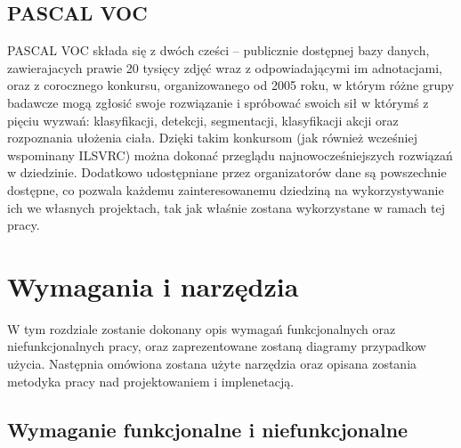 \documentclass[a4paper,twoside,12pt]{book}
\begin{document}
{{\section{PASCAL VOC}
{PASCAL VOC\cite{everingham2015pascal}\cite{PASCAL} składa się z dwóch cześci – publicznie dostępnej bazy danych, zawierajacych prawie 20 tysięcy zdjęć wraz z odpowiadającymi im adnotacjami, oraz z corocznego konkursu, organizowanego od 2005 roku, w którym różne grupy badawcze mogą zgłosić swoje rozwiązanie i spróbować swoich sił w którymś z pięciu wyzwań: klasyfikacji, detekcji, segmentacji, klasyfikacji akcji oraz rozpoznania ułożenia ciała.}
{Dzięki takim konkursom (jak również wcześniej wspominany ILSVRC) można dokonać przeglądu najnowocześniejszych rozwiązań w dziedzinie. Dodatkowo udostępniane przez organizatorów dane są powszechnie dostępne, co pozwala każdemu zainteresowanemu dziedziną na wykorzystywanie ich we własnych projektach, tak jak właśnie zostana wykorzystane w ramach tej pracy.
}

 
\chapter{Wymagania i narzędzia}
{W tym rozdziale zostanie dokonany opis wymagań funkcjonalnych oraz niefunkcjonalnych pracy, oraz zaprezentowane zostaną diagramy przypadkow użycia. Następnia omówiona zostana użyte narzędzia oraz opisana zostania metodyka pracy nad projektowaniem i implenetacją.}
\section{Wymaganie funkcjonalne i niefunkcjonalne}
}}
\end{document}
